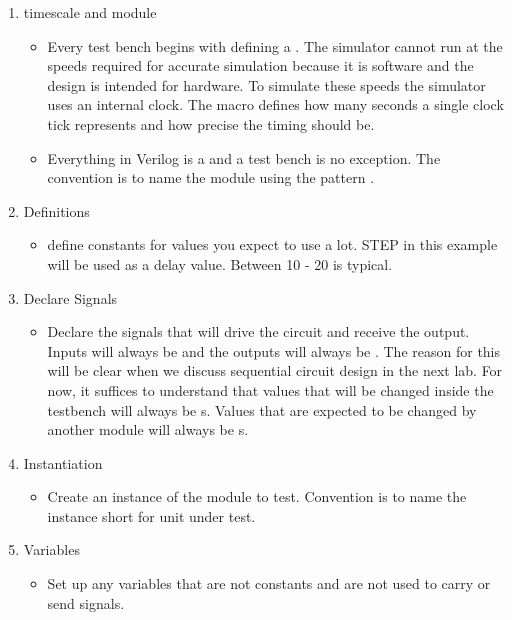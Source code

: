\documentclass[12pt]{labmanual}
\begin{document}
\begin{enumerate}
    \item timescale and module
    \begin{itemize}
        \item {} Every test bench begins with defining a . The simulator cannot run at the speeds required for accurate simulation because it is software and the design is intended for hardware. To simulate these speeds the simulator uses an internal clock. The  macro defines how many seconds a single clock tick represents and how precise the timing should be.
        \item {} Everything in Verilog is a  and a test bench is no exception. The convention is to name the module using the pattern .
    \end{itemize}
    \item Definitions
    \begin{itemize}
        \item define constants for values you expect to use a lot. STEP in this example will be used as a delay value. Between 10 - 20 is typical.
    \end{itemize}
    \item  Declare Signals
    \begin{itemize}
        \item Declare the signals that will drive the circuit and receive the output. Inputs will always be  and the outputs will always be . The reason for this will be clear when we discuss sequential circuit design in the next lab. For now, it suffices to understand that values that will be changed inside the testbench will always be s. Values that are expected to be changed by another module will always be s.
    \end{itemize}
    \item Instantiation
    \begin{itemize}
        \item Create an instance of the module to test. Convention is to name the instance  short for unit under test.
    \end{itemize}
    \item Variables
    \begin{itemize}
        \item Set up any variables that are not constants and are not used to carry or send signals.

\end{itemize}
\end{enumerate}
\end{document}
